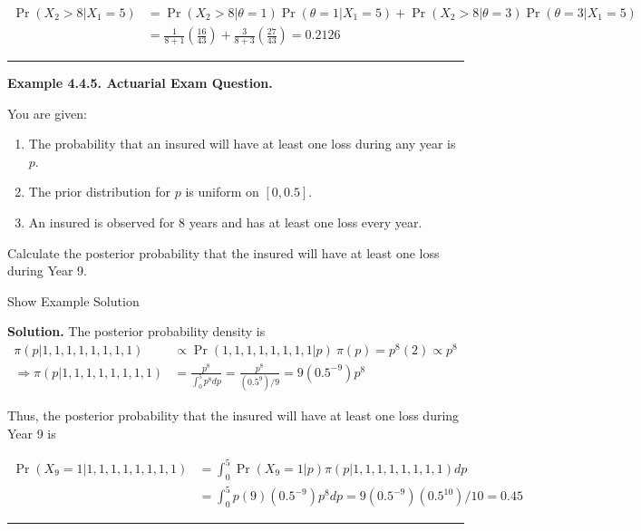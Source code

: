 \documentclass[]{book}
\providecommand{\tightlist}{%
  \setlength{\itemsep}{0pt}\setlength{\parskip}{0pt}}
\theoremstyle{definition}
\theoremstyle{definition}
\theoremstyle{definition}
\theoremstyle{remark}
\begin{document}
\[
\begin{aligned}
\Pr(X_2>8|X_1=5) &= \Pr(X_2>8|\theta=1) \Pr(\theta=1|X_1=5) + \Pr(X_2>8|\theta=3) \Pr(\theta=3 | X_1=5) \\
&= \frac{1}{8+1}\left( \frac{16}{43}\right) + \frac{3}{8+3} \left( \frac{27}{43}\right) = 0.2126
\end{aligned}
\]

\begin{center}\rule{0.5\linewidth}{\linethickness}\end{center}

\textbf{Example 4.4.5. Actuarial Exam Question.}

You are given:

\begin{enumerate}
\def\labelenumi{(\roman{enumi})}
\tightlist
\item
  The probability that an insured will have at least one loss during any
  year is \(p\).
\item
  The prior distribution for \(p\) is uniform on \([0, 0.5]\).
\item
  An insured is observed for 8 years and has at least one loss every
  year.
\end{enumerate}

Calculate the posterior probability that the insured will have at least
one loss during Year 9.

Show Example Solution

\hypertarget{toggleExampleSelect.4.5}{}
\textbf{Solution.} The posterior probability density is \[
\begin{aligned}
\pi(p|1,1,1,1,1,1,1,1) &\propto \Pr(1,1,1,1,1,1,1,1|p)\ \pi(p) = p^8(2) \propto p^8 \\ 
\Rightarrow \pi(p|1,1,1,1,1,1,1,1) &= \frac{p^8}{\int_0^5 p^8 dp} = \frac{p^8}{(0.5^9)/9} = 9(0.5^{-9})p^8
\end{aligned}
\]

Thus, the posterior probability that the insured will have at least one
loss during Year 9 is

\[
\begin{aligned}
\Pr(X_9=1|1,1,1,1,1,1,1,1) &= \int_0^5 \Pr(X_9=1|p) \pi(p|1,1,1,1,1,1,1,1) dp \\
&= \int_0^5 p(9)(0.5^{-9})p^8 dp = 9(0.5^{-9})(0.5^{10})/10 = 0.45
\end{aligned}
\]

\begin{center}\rule{0.5\linewidth}{\linethickness}\end{center}
\end{document}
